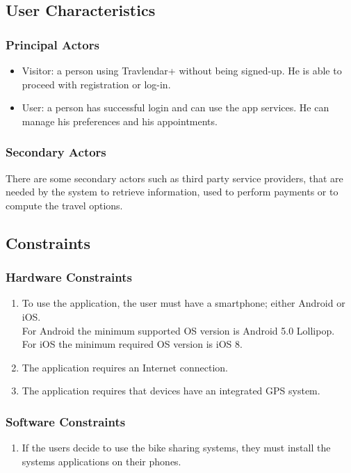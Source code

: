 \subsection{User Characteristics}

\subsubsection{Principal Actors}

\renewcommand{\labelitemi}{$-$}
\begin{itemize}
\item
Visitor: a person using Travlendar+ without being signed-up. He is able to proceed with registration or log-in.
\item
User: a person has successful login and can use the app services. He can manage his preferences and his appointments.
\end{itemize}

\subsubsection{Secondary Actors}
There are some secondary actors such as third party service providers, that are needed by the system to retrieve information, used to perform payments or to compute the travel options. 


\subsection{Constraints}
\subsubsection{Hardware Constraints}
\begin{enumerate}
\item
To use the application, the user must have a smartphone; either Android or iOS.\\
For Android the minimum supported OS version is Android 5.0 Lollipop.\\
For iOS the minimum required OS version is iOS 8.
\item
The application requires an Internet connection.
\item
The application requires that devices have an integrated GPS system.
\end{enumerate}

\subsubsection{Software Constraints}
\begin{enumerate}
\item
If the users decide to use the bike sharing systems, they must install the systems applications on their phones.
\end{enumerate}

